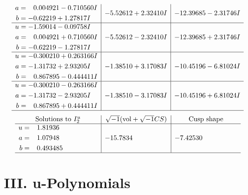 \documentclass[1p]{elsarticle_modified}
\theoremstyle{definition}
\newcommand{\I}{\sqrt{-1}}
\begin{document}
$$\begin{array}{c|c|c}
\begin{aligned}
a &= \phantom{-}0.004921 - 0.710560 I \\
b &= -0.62219 + 1.27817 I\end{aligned}
 & -5.52612 + 2.32410 I & -12.39685 - 2.31746 I \\ \hline\begin{aligned}
u &= -1.59014 - 0.09758 I \\
a &= \phantom{-}0.004921 + 0.710560 I \\
b &= -0.62219 - 1.27817 I\end{aligned}
 & -5.52612 - 2.32410 I & -12.39685 + 2.31746 I \\ \hline\begin{aligned}
u &= -0.300210 + 0.263166 I \\
a &= -1.31732 + 2.93205 I \\
b &= \phantom{-}0.867895 - 0.444411 I\end{aligned}
 & -1.38510 + 3.17083 I & -10.45196 - 6.81024 I \\ \hline\begin{aligned}
u &= -0.300210 - 0.263166 I \\
a &= -1.31732 - 2.93205 I \\
b &= \phantom{-}0.867895 + 0.444411 I\end{aligned}
 & -1.38510 - 3.17083 I & -10.45196 + 6.81024 I\\
 \hline 
 \end{array}$$\newpage$$\begin{array}{c|c|c}  
\text{Solutions to }I^u_{2}& \I (\text{vol} + \sqrt{-1}CS) & \text{Cusp shape}\\
 \hline 
\begin{aligned}
u &= \phantom{-}1.81936\phantom{ +0.000000I} \\
a &= \phantom{-}1.07948\phantom{ +0.000000I} \\
b &= \phantom{-}0.493485\phantom{ +0.000000I}\end{aligned}
 & -15.7834\phantom{ +0.000000I} & -7.42530\phantom{ +0.000000I}\\
 \hline 
 \end{array}$$\newpage
\newpage\renewcommand{\arraystretch}{1}
\centering \section*{ III. u-Polynomials}
\end{document}
